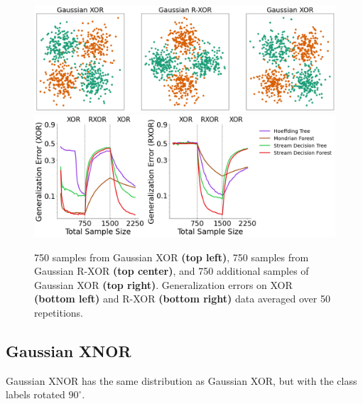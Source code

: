 \begin{figure}[!htb]
  \centering
  \includegraphics[width=1.0\textwidth]{XOR_RXOR_data.png}
  \includegraphics[width=1.0\textwidth]{XOR_RXOR_results.png}
    \caption{750 samples from Gaussian XOR \textbf{(top left)}, 750 samples from Gaussian R-XOR \textbf{(top center)}, and 750 additional samples of Gaussian XOR \textbf{(top right)}. Generalization errors on XOR \textbf{(bottom left)} and R-XOR \textbf{(bottom right)} data averaged over 50 repetitions. 
    }
  \label{fig:rxor}
\end{figure}

\subsection{Gaussian XNOR}Gaussian XNOR has the same distribution as Gaussian XOR, but with the class labels rotated $90^\circ$. 

